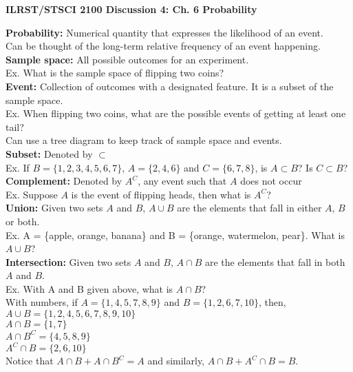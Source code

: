 \documentclass[12pt]{article}
\begin{document}
\begin{center}
\textbf{ILRST/STSCI 2100 Discussion 4: Ch. 6 Probability}
\end{center}

\noindent \textbf{Probability:} Numerical quantity that expresses the likelihood of an event. \\
Can be thought of the long-term relative frequency of an event happening.\\

\noindent \textbf{Sample space:} All possible outcomes for an experiment.\\
Ex. What is the sample space of flipping two coins?\\

\noindent \textbf{Event:} Collection of outcomes with a designated feature. It is a subset of the sample space.\\
Ex. When flipping two coins, what are the possible events of getting at least one tail?\\

\noindent Can use a tree diagram to keep track of sample space and events.\\

\noindent \textbf{Subset:} Denoted by $\subset$\\
\noindent Ex. If $B = \{1,2,3,4,5,6,7\}$, $A = \{2,4,6\}$ and $C = \{6,7,8\}$, is $A \subset B$? Is $C \subset B$?\\

\noindent \textbf{Complement:} Denoted by $A^{C}$, any event such that $A$ does not occur\\
\noindent Ex. Suppose $A$ is the event of flipping heads, then what is $A^{C}$?\\

\noindent \textbf{Union:}  Given two sets $A$ and $B$, $A \cup B$ are the elements that fall in either $A$, $B$ or both. \\
Ex. A = \{apple, orange, banana\} and B = \{orange, watermelon, pear\}. What is $A \cup B$?\\

\noindent \textbf{Intersection:} Given two sets $A$ and $B$, $A \cap B$ are the elements that fall in both $A$ and $B$. \\
Ex. With A and B given above, what is $A \cap B$?\\

\noindent With numbers, if $A = \{1, 4, 5, 7, 8, 9\}$ and $B = \{1, 2, 6, 7, 10\}$, then, \\
$A \cup B = \{1, 2, 4, 5, 6, 7, 8, 9, 10\}$ \\
$A \cap B = \{1, 7\}$ \\
$A \cap B^{C} = \{4, 5, 8, 9\}$ \\
$A^{C} \cap B = \{2, 6, 10\}$ \\
Notice that $A \cap B + A \cap B^{C} = A$ and similarly, $A \cap B + A^{C} \cap B = B$. \\
\end{document}
